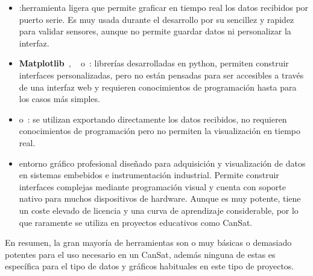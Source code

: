 \begin{itemize}
    \item \textbf{\cite{serialplot}}:herramienta ligera que permite graficar en tiempo real los datos recibidos por puerto serie.
    Es muy usada durante el desarrollo por su sencillez y rapidez para validar sensores, aunque no permite guardar datos ni personalizar la interfaz.
    \item \textbf{Matplotlib}~\cite{matplotlib}, ~\textbf{\cite{pyqtgraph}} o~\textbf{\cite{tkinter}}: librerías desarrolladas en python, permiten construir interfaces personalizadas, pero no están pensadas para ser accesibles a través de una interfaz web y requieren conocimientos de programación hasta para los casos más simples.
    \item \textbf{\cite{excel}} o~\textbf{\cite{googlesheets}}: se utilizan exportando directamente los datos recibidos, no requieren conocimientos de programación pero no permiten la visualización en tiempo real.
    \item \textbf{\cite{labview}} entorno gráfico profesional diseñado para adquisición y visualización de datos en sistemas embebidos e instrumentación industrial.
    Permite construir interfaces complejas mediante programación visual y cuenta con soporte nativo para muchos dispositivos de hardware.
    Aunque es muy potente, tiene un coste elevado de licencia y una curva de aprendizaje considerable, por lo que raramente se utiliza en proyectos educativos como CanSat.
\end{itemize}

En resumen, la gran mayoría de herramientas son o muy básicas o demasiado potentes para el uso necesario en un CanSat, además ninguna de estas es específica para el tipo de datos y gráficos habituales en este tipo de proyectos.

